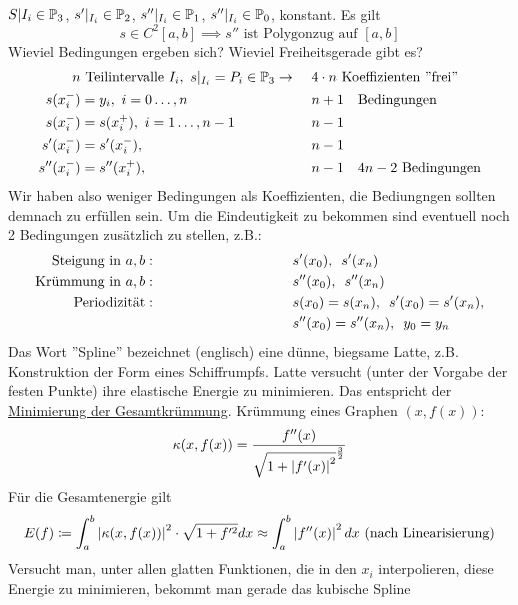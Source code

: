 \begin{question}\hfill\\
    $S\vert{I_i}\in \mathbb{P}_3$, $s'\vert_{I_i}\in\mathbb{P}_2$, $s''\vert_{I_i}\in\mathbb{P}_1$, $s''\vert_{I_i}\in\mathbb{P}_0$, konstant.
    Es gilt \[
        s \in C^2[a,b] \implies s'' \text{ ist Polygonzug auf }[a,b]
    \]
    Wieviel Bedingungen ergeben sich? Wieviel Freiheitsgerade gibt es?
    \begin{align*}
        n &\text{ Teilintervalle } I_i,\ s\vert_{I_i}=P_i\in\mathbb{P}_3 \to \ &&4\cdot n\ \text{Koeffizienten ''frei''}\\
    s(x_i^-)&=y_i,\ i=0\dots,n \ &&n+1\quad \text{Bedingungen}\\
        s(x_i^-)&=s(x_i^+),\ i=1\dots,n-1 \qquad &&n-1 \\
        s'(x_i^-)&=s'(x_i^-),  \ &&n-1 \\
        s''(x_i^-)&=s''(x_i^+),  \ &&n-1 \quad 4n-2 \text{ Bedingungen}
    \end{align*}
    Wir haben also weniger Bedingungen als Koeffizienten, die Bediungngen sollten demnach zu erfüllen sein. Um die 
    Eindeutigkeit zu bekommen sind eventuell noch 2 Bedingungen zusätzlich zu stellen, z.B.:
  \begin{align*}
      \text{Steigung in }a,b:\hspace{10em} & s'(x_0), \midspace s'(x_n)\\
      \text{Krümmung in }a,b:\hspace{10em}& s''(x_0), \midspace s''(x_n)\\
      \text{Periodizität}:\hspace{10em} & s(x_0) = s(x_n), \midspace s'(x_0) = s'(x_n),\\ & s''(x_0) = s''(x_n), \midspace 
      y_0 = y_n
  \end{align*}
  Das Wort ''Spline'' bezeichnet (englisch) eine dünne, biegsame Latte, z.B. Konstruktion der Form eines Schiffrumpfs. 
  Latte versucht (unter der Vorgabe der festen Punkte) ihre elastische Energie zu minimieren. Das entspricht der \underline{
  Minimierung der Gesamtkrümmung}. Krümmung eines Graphen $(x,f(x))$:\[
    \kappa(x,f(x)) = \frac{f''(x)}{\sqrt{1+\left\vert f'(x) \right\vert^2}^{\frac{3}{2}}}
  \]
  Für die Gesamtenergie gilt\[
    E(f) \coloneqq \int_a^b \left\vert \kappa(x,f(x)) \right\vert^2 \cdot \sqrt{1+f'^2} dx \approx \int_a^b \left\vert f''(x) \right\vert^2 dx \text{ (nach 
    Linearisierung)}
  \]
  Versucht man, unter allen glatten Funktionen, die in den $x_i$ interpolieren, diese Energie zu minimieren, bekommt man 
  gerade das kubische Spline
\end{question}

